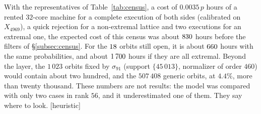 \documentclass[11pt,a4paper]{amsart}
\theoremstyle{plain}
\theoremstyle{definition}
\newcommand{\st}[1]{\textup{\textsf{\small[#1]}}}
\newcommand{\HEUR}{\st{heuristic}}
\begin{document}
With the representatives of Table~\ref{tab:census}, a cost of $0.0035\,p$ hours of a rented $32$-core machine for a complete execution of both sides (calibrated on $X_{4969}$), a quick rejection for a non-extremal lattice and two executions for an extremal one, the expected cost of this census was about $830$ hours before the filters of \S\ref{subsec:census}. For the $18$ orbits still open, it is about $660$ hours with the same probabilities, and about $1\,700$ hours if they are all extremal. Beyond the layer, the $1\,023$ orbits fixed by $\sigma_{91}$ (support $\{45\,013\}$, normalizer of order $460$) would contain about two hundred, and the $507\,408$ generic orbits, at $4.4\%$, more than twenty thousand. These numbers are not results: the model was compared with only two cases in rank $56$, and it underestimated one of them. They say where to look. \HEUR
\end{document}
